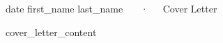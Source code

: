 \documentclass[11pt, a4paper]{awesome-cv}
\begin{document}
\makecvheader[C]

\makecvfooter
  {
    {{ date }}}
  {
    {{ first_name }} {{ last_name }}~~~·~~~Cover Letter}
  {}

\makelettertitle

\begin{cvletter}

{{ cover_letter_content }}

\end{cvletter}

\makeletterclosing
\end{document}
